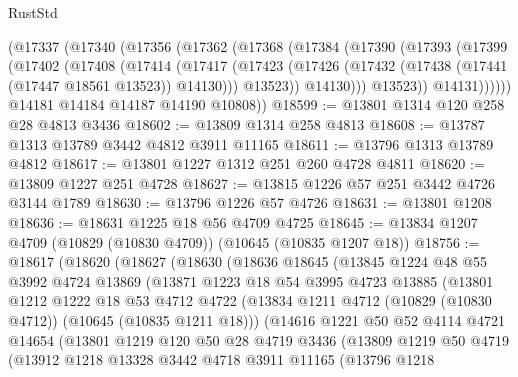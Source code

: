 \begin{lexlean}{RustStd}
\begin{coremodule}
      (@17337
        (@17340
          (@17356
            (@17362
              (@17368
                (@17384
                  (@17390
                    (@17393
                      (@17399
                        (@17402
                          (@17408
                            (@17414
                              (@17417
                                (@17423
                                  (@17426 (@17432 (@17438 (@17441 (@17447 @18561 @13523)) @14130)))
                                  @13523))
                              @14130)))
                        @13523))
                    @14131))))))
        @14181
        @14184
        @14187
        @14190
        @10808))
@18599 := @13801 @1314 @120 @258 @28 @4813 @3436
@18602 := @13809 @1314 @258 @4813
@18608 := @13787 @1313 @13789 @3442 @4812 @3911 @11165
@18611 := @13796 @1313 @13789 @4812
@18617 := @13801 @1227 @1312 @251 @260 @4728 @4811
@18620 := @13809 @1227 @251 @4728
@18627 := @13815 @1226 @57 @251 @3442 @4726 @3144 @1789
@18630 := @13796 @1226 @57 @4726
@18631 := @13801 @1208
@18636 := @18631 @1225 @18 @56 @4709 @4725
@18645 := @13834 @1207 @4709 (@10829 (@10830 @4709)) (@10645 (@10835 @1207 @18))
@18756 := @18617
    (@18620
      (@18627
        (@18630
          (@18636
            @18645
            (@13845
              @1224
              @48
              @55
              @3992
              @4724
              @13869
              (@13871
                @1223
                @18
                @54
                @3995
                @4723
                @13885
                (@13801
                  @1212
                  @1222
                  @18
                  @53
                  @4712
                  @4722
                  (@13834 @1211 @4712 (@10829 (@10830 @4712)) (@10645 (@10835 @1211 @18)))
                  (@14616
                    @1221
                    @50
                    @52
                    @4114
                    @4721
                    @14654
                    (@13801
                      @1219
                      @120
                      @50
                      @28
                      @4719
                      @3436
                      (@13809
                        @1219
                        @50
                        @4719
                        (@13912
                          @1218
                          @13328
                          @3442
                          @4718
                          @3911
                          @11165
                          (@13796
                            @1218

\end{coremodule}
\end{lexlean}
